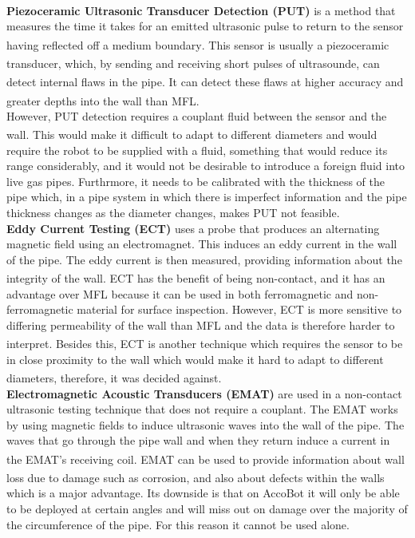\documentclass[11pt]{article}		%
\newcommand{\supercite}[1]{\textsuperscript{\cite{#1}}}		%
\begin{document}
	        \\\hspace*{2ex}
	        \textbf{Piezoceramic Ultrasonic Transducer Detection (PUT)} is a method that measures the time it takes for an emitted ultrasonic pulse to return to the sensor having reflected off a medium boundary\supercite{UT_explanation}. This sensor is usually a piezoceramic transducer\supercite{UT}, which, by sending and receiving short pulses of ultrasounde, can detect internal flaws in the pipe\supercite{Corrosion}. It can detect these flaws at higher accuracy and greater depths into the wall than MFL\supercite{MFL_Pig}.
	        \\
            \hspace*{2ex}However, PUT detection requires a couplant fluid between the sensor and the wall\supercite{UT_explanation}. This would make it difficult to adapt to different diameters and would require the robot to be supplied with a fluid, something that would reduce its range considerably, and it would not be desirable to introduce a foreign fluid into live gas pipes. Furthrmore, it needs to be calibrated with the thickness of the pipe which, in a pipe system in which there is imperfect information and the pipe thickness changes as the diameter changes, makes PUT not feasible.
	       \\\hspace*{2ex}
	        \textbf{Eddy Current Testing (ECT)} uses a probe that produces an alternating magnetic field using an electromagnet. This induces an eddy current in the wall of the pipe. The eddy current is then measured, providing information about the integrity of the wall\supercite{ECT}. ECT has the benefit of being non-contact\supercite{Corrosion}, and it has an advantage over MFL because it can be used in both ferromagnetic and non-ferromagnetic material for surface inspection. However, ECT is more sensitive to differing permeability of the wall than MFL and the data is therefore harder to interpret\supercite{MFL_explanation}. Besides this, ECT is another technique which requires the sensor to be in close proximity to the wall which would make it hard to adapt to different diameters, therefore, it was decided against\supercite{ECT}.
	        \\\hspace*{2ex}
	        \textbf{Electromagnetic Acoustic Transducers (EMAT)} are used in a non-contact ultrasonic testing technique that does not require a couplant. The EMAT works by using magnetic fields to induce ultrasonic waves into the wall of the pipe. The waves that go through the pipe wall and when they return induce a current in the EMAT’s receiving coil\supercite{EMAT}. EMAT can be used to provide information about wall loss due to damage such as corrosion\supercite{EMAT}, and also about defects within the walls which is a major advantage. Its downside is that on AccoBot it will only be able to be deployed at certain angles and will miss out on damage over the majority of the circumference of the pipe. For this reason it cannot be used alone.
\end{document}
